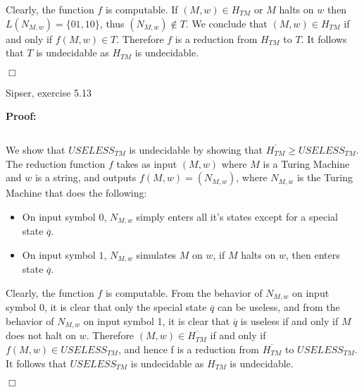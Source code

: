 \documentclass[11pt]{article}
\newcommand{\question}[2] {\vspace{.25in} \fbox{#1} #2 \vspace{.10in}}
\begin{document}
Clearly, the function $f$ is computable. If $(M,w) \in H_{TM}$ or $M$ halts on $w$ then 
\indent $L(N_{M,w}) = \{01,10\}$, thus $(N_{M,w}) \notin T$. We conclude that $(M,w) \in H_{TM}$ if and 
\indent only if $f(M,w) \in T$. Therefore $f$ is a reduction from $H_{TM}$ to $T$. It follows that $T$ is 
\indent undecidable as $H_{TM}$ is undecidable.

\indent $\Box$

\pagebreak

\question{7}{Sipser, exercise 5.13}

\textbf{Proof:}

$ $

We show that $USELESS_{TM}$ is undecidable by showing that $\overline{H_{TM}} \geq USELESS_{TM}$. 
\indent The reduction function $f$ takes as input $(M,w)$ where $M$ is a Turing Machine and $w$ 
\indent is a string, and outputs $f(M,w) = (N_{M,w})$, where $N_{M,w}$ is the Turing Machine that
\indent does the following:

 \begin{center}
  \begin{itemize}
    \item On input symbol $0$, $N_{M,w}$ simply enters all it's states except for a special state $\overline{q}$.
    \item On input symbol $1$, $N_{M,w}$ simulates $M$ on $w$, if $M$ halts on $w$, then enters state $\overline{q}$.
  \end{itemize}
 \end{center}

Clearly, the function $f$ is computable. From the behavior of  $N_{M,w}$ on input symbol $0$,
\indent it is clear that only the special state $\overline{q}$ can be useless, and from the behavior of $N_{M,w}$
\indent on input symbol 1, it is clear that $\overline{q}$ is useless if and only if $M$ does not halt  on $w$. 
\indent Therefore $(M,w) \in \overline{H_{TM}}$ if and only if $f(M,w) \in USELESS_{TM}$, and hence f is a 
\indent reduction from $\overline{H_{TM}}$ to $USELESS_{TM}$. It follows that $USELESS_{TM}$ is undecidable 
\indent as $H_{TM}$ is undecidable.

\indent $\Box$
\end{document}
